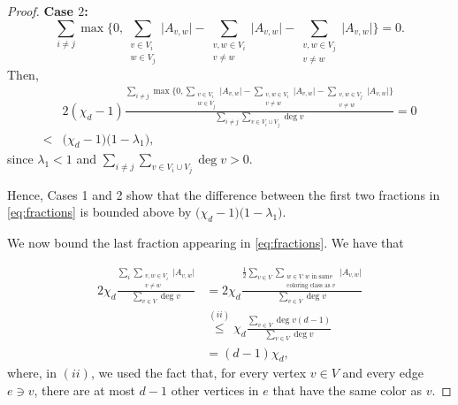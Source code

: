 \documentclass{article}
\theoremstyle{plain}
\theoremstyle{definition}
\theoremstyle{remark}
\begin{document}
\begin{proof}
\textbf{Case $2$:}
    \[
    \sum_{i\neq j}\max\biggl\{0,\sum_{\substack{v\in V_i\\w\in V_j}}\bigl| A_{v,w}\bigr| - \sum_{\substack{v,w\in V_i\\ v\neq w}}\bigl|A_{v,w}\bigr| - \sum_{\substack{v,w\in V_j\\v\neq w}}\bigl|A_{v,w}\bigr|\biggr\}=0.
    \]
    Then,
    \begin{align*}
        &2(\chi_d-1) \frac{\sum_{i\neq j}\max\biggl\{0,\sum_{\substack{v\in V_i\\w\in V_j}}\bigl| A_{v,w}\bigr| - \sum_{\substack{v,w\in V_i\\ v\neq w}}\bigl|A_{v,w}\bigr| - \sum_{\substack{v,w\in V_j\\v\neq w}}\bigl|A_{v,w}\bigr|\biggr\}}{\sum_{i\neq j}\sum_{v\in V_i\cup V_j}\deg v} = 0\\
        <& \bigl(\chi_d-1\bigr)\bigl(1-\lambda_1\bigr),
    \end{align*}
    since $\lambda_1<1$ and $\sum_{i\neq j}\sum_{v\in V_i\cup V_j}\deg v>0$.\newline 







   Hence, Cases 1 and 2 show that the difference between the first two fractions in \eqref{eq:fractions} is bounded above by $\bigl(\chi_d-1\bigr)\bigl(1-\lambda_1\bigr)$.\newline 

    We now bound the last  fraction appearing in \eqref{eq:fractions}. We have that

    \begin{align*}
        2\chi_d\frac{\sum_i\sum_{\substack{v,w\in V_i\\ v\neq w}}\bigl| A_{v,w}\bigr|}{\sum_{v\in V}\deg v}
        &= 2\chi_d\frac{\frac12 \sum_{v\in V}\sum_{\substack{w\in V\colon w \text{ in same}\\ \text{coloring class as $v$}}}\bigl|A_{v,w}\bigr|}{\sum_{v\in V}\deg v}\\
        &\overset{(ii)}{\leq} \chi_d \frac{\sum_{v\in V}\deg v(d-1)}{\sum_{v\in V}\deg v}\\
        &=(d-1)\chi_d,
    \end{align*}
    where, in $(ii)$, we used the fact that, for every vertex $v\in V$ and every edge $e\ni v$, there are at most $d-1$ other vertices in $e$ that have the same color as $v$.\newline
    

\end{proof}
\end{document}
